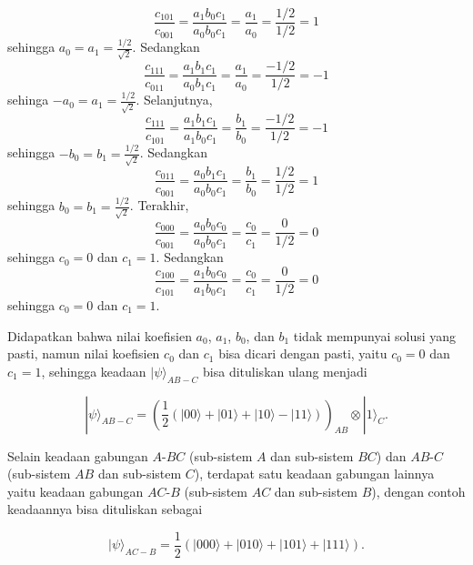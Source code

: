 \begin{equation}
	\frac{c_{101}}{c_{001}}=\frac{a_1 b_0 c_1}{a_0 b_0 c_1}=\frac{a_1}{a_0}=\frac{1/2}{1/2}=1
\end{equation}
sehingga $a_0=a_1=\frac{1/2}{\sqrt{2}}$.
Sedangkan
\begin{equation}
	\frac{c_{111}}{c_{011}}=\frac{a_1 b_1 c_1}{a_0 b_1 c_1}=\frac{a_1}{a_0}=\frac{-1/2}{1/2}=-1
\end{equation}
sehinga $-a_0=a_1=\frac{1/2}{\sqrt{2}}$. Selanjutnya,
\begin{equation}
	\frac{c_{111}}{c_{101}}=\frac{a_1 b_1 c_1}{a_1 b_0 c_1}=\frac{b_1}{b_0}=\frac{-1/2}{1/2}=-1
\end{equation}
sehingga $-b_0=b_1=\frac{1/2}{\sqrt{2}}$.
Sedangkan
\begin{equation}
	\frac{c_{011}}{c_{001}}=\frac{a_0 b_1 c_1}{a_0 b_0 c_1}=\frac{b_1}{b_0}=\frac{1/2}{1/2}=1
\end{equation}
sehingga $b_0=b_1=\frac{1/2}{\sqrt{2}}$. Terakhir,
\begin{equation}
	\frac{c_{000}}{c_{001}}=\frac{a_0 b_0 c_0}{a_0 b_0 c_1}=\frac{c_0}{c_1}=\frac{0}{1/2}=0
\end{equation}
sehingga $c_0=0$ dan $c_1=1$.
Sedangkan
\begin{equation}
	\frac{c_{100}}{c_{101}}=\frac{a_1 b_0 c_0}{a_1 b_0 c_1}=\frac{c_0}{c_1}=\frac{0}{1/2}=0
\end{equation}
sehingga $c_0=0$ dan $c_1=1$.

Didapatkan bahwa nilai koefisien
$a_0$, $a_1$, $b_0$, dan $b_1$ tidak mempunyai solusi yang pasti, namun nilai koefisien $c_0$ dan $c_1$ bisa dicari dengan pasti, yaitu $c_0 = 0$ dan $c_1 = 1$, sehingga keadaan $|\psi\rangle_{AB-C}$ bisa dituliskan ulang menjadi

\begin{equation}
|\psi\rangle_{AB-C}
=
\left(
\frac{1}{2}
(|00\rangle + |01\rangle + |10\rangle - |11\rangle)
\right)_{AB}
\otimes
|1\rangle_C .
\end{equation}

Selain keadaan gabungan $A$-$BC$ (sub-sistem $A$ dan sub-sistem $BC$) dan $AB$-$C$ (sub-sistem $AB$ dan sub-sistem $C$), terdapat satu keadaan gabungan lainnya yaitu keadaan gabungan $AC$-$B$ (sub-sistem $AC$ dan sub-sistem $B$), dengan contoh
keadaannya bisa dituliskan sebagai

\begin{equation}
|\psi\rangle_{AC-B}
=
\frac{1}{2}
\left(
|000\rangle + |010\rangle + |101\rangle + |111\rangle
\right) .
\end{equation}

